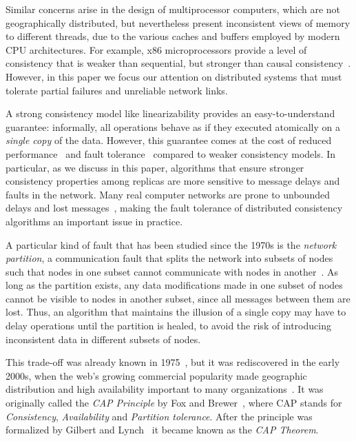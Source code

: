\documentclass[a4paper,twocolumn,10pt]{article}
\begin{document}
Similar concerns arise in the design of multiprocessor computers, which are not geographically
distributed, but nevertheless present inconsistent views of memory to different threads, due to the
various caches and buffers employed by modern CPU architectures. For example, x86 microprocessors
provide a level of consistency that is weaker than sequential, but stronger than causal
consistency~\cite{Sewell2010fj}. However, in this paper we focus our attention on distributed
systems that must tolerate partial failures and unreliable network links.

A strong consistency model like linearizability provides an easy-to-understand guarantee:
informally, all operations behave as if they executed atomically on a \emph{single copy} of the
data. However, this guarantee comes at the cost of reduced performance~\cite{Attiya1994gw} and fault
tolerance~\cite{Davidson1985hv} compared to weaker consistency models. In particular, as we discuss
in this paper, algorithms that ensure stronger consistency properties among replicas are more
sensitive to message delays and faults in the network. Many real computer networks are prone to
unbounded delays and lost messages~\cite{Bailis2014jx}, making the fault tolerance of distributed
consistency algorithms an important issue in practice.

A particular kind of fault that has been studied since the 1970s is the \emph{network partition}, a
communication fault that splits the network into subsets of nodes such that nodes in one subset
cannot communicate with nodes in another~\cite{Johnson1975we, Lindsay1979wv, Fischer1982hc, Davidson1985hv}.
As long as the partition exists, any data modifications made in one subset of nodes cannot be
visible to nodes in another subset, since all messages between them are lost. Thus, an algorithm
that maintains the illusion of a single copy may have to delay operations until the partition is
healed, to avoid the risk of introducing inconsistent data in different subsets of nodes.

This trade-off was already known in 1975~\cite{Johnson1975we}, but it was rediscovered in the early
2000s, when the web's growing commercial popularity made geographic distribution and high
availability important to many organizations~\cite{Brewer2012tr, Vogels2008ey}. It was originally
called the \emph{CAP Principle} by Fox and Brewer~\cite{Fox1999bs, Brewer2000vd}, where CAP stands
for \emph{Consistency}, \emph{Availability} and \emph{Partition tolerance}. After the principle was
formalized by Gilbert and Lynch~\cite{Gilbert2002il, Gilbert2012bf} it became known as the
\emph{CAP Theorem}.
\end{document}
